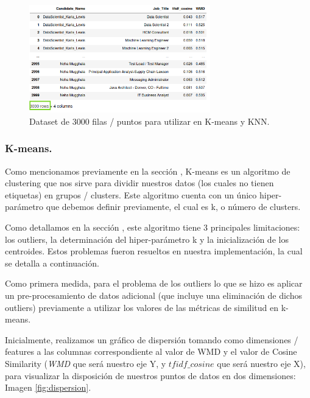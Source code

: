 \documentclass[12pt,a4paper]{article}
\begin{document}
\begin{sloppypar}
\begin{itemize}
\begin{figure}[H]   
\centering
\includegraphics[width=0.7\textwidth]{images/implementacion_5/dataset_kmeans_knn_final.png}
\caption{Dataset de 3000 filas / puntos para utilizar en K-means y KNN.}
\label{fig:dataset_kmeans_knn_final}
\end{figure}

\end{itemize}

\cleardoublepage

\subsubsection{K-means.}\label{imp_kmeans}

Como mencionamos previamente en la sección \textit{}, K-means es un algoritmo de clustering que nos sirve para dividir nuestros datos (los cuales no tienen etiquetas) en grupos / clusters. Este algoritmo cuenta con un único hiper-parámetro que debemos definir previamente, el cual es k, o número de clusters.

Como detallamos en la sección \textit{}, este algoritmo tiene 3 principales limitaciones: los outliers, la determinación del hiper-parámetro k y la inicialización de los centroides. Estos problemas fueron resueltos en nuestra implementación, la cual se detalla a continuación. 

Como primera medida, para el problema de los outliers lo que se hizo es aplicar un pre-procesamiento de datos adicional (que incluye una eliminación de dichos outliers) previamente a utilizar los valores de las métricas de similitud en k-means. 

Inicialmente, realizamos un gráfico de dispersión tomando como dimensiones / features a las columnas correspondiente al valor de WMD y el valor de Cosine Similarity (\textit{WMD} que será nuestro eje Y, y \textit{$tfidf\_cosine$} que será nuestro eje X), para visualizar la disposición de nuestros puntos de datos en dos dimensiones: Imagen \ref{fig:dispersion}.


\end{sloppypar}
\end{document}
